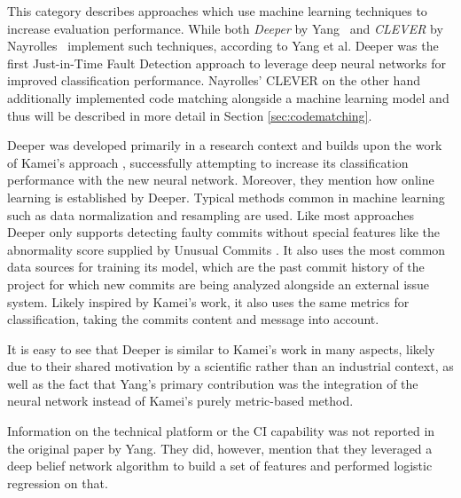 This category describes approaches which use machine learning techniques to increase evaluation performance.
While both \textit{Deeper} by Yang~\cite{Yang2015} and \textit{CLEVER} by Nayrolles~\cite{Nayrolles2018} implement such techniques, according to Yang et al. Deeper was the first Just-in-Time Fault Detection approach to leverage deep neural networks for improved classification performance. Nayrolles' CLEVER on the other hand additionally implemented code matching alongside a machine learning model and thus will be described in more detail in Section \ref{sec:codematching}.

Deeper was developed primarily in a research context and builds upon the work of Kamei's approach \cite{Kamei2013}, successfully attempting to increase its classification performance with the new neural network. 
Moreover, they mention how online learning is established by Deeper.
Typical methods common in machine learning such as data normalization and resampling are used. Like most approaches Deeper only supports detecting faulty commits without special features like the abnormality score supplied by Unusual Commits \cite{Goyal2017}. It also uses the most common data sources for training its model, which are the past commit history of the project for which new commits are being analyzed alongside an external issue system. Likely inspired by Kamei's work, it also uses the same metrics for classification, taking the commits content and message into account. 

It is easy to see that Deeper is similar to Kamei's work in many aspects, likely due to their shared motivation by a scientific rather than an industrial context, as well as the fact that Yang's primary contribution was the integration of the neural network instead of Kamei's purely metric-based method.

Information on the technical platform or the CI capability was not reported in the original paper by Yang. They did, however, mention that they leveraged a deep belief network algorithm to build a set of features and performed logistic regression on that.

